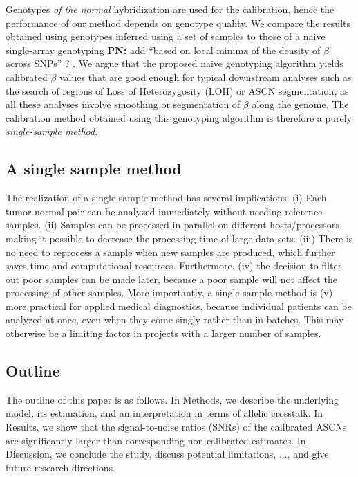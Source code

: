 \documentclass[10pt]{bmc_article}
\newenvironment{bmcformat}{\fussy\setboolean{publ}{true}}{\fussy}
\newenvironment{PN}{\color{blue}\textbf{PN:}}{}
\begin{document}
\begin{bmcformat}
Genotypes \emph{of the normal} hybridization are used for the calibration, hence the performance of our method depends on genotype quality. We compare the results obtained using genotypes inferred using a set of samples to those of a naive single-array genotyping
\begin{PN}
  add ``based on local minima of the density of $\beta$ across SNPs'' ?
\end{PN}. We argue that the proposed naive genotyping algorithm yields calibrated $\beta$ values that are good enough for typical downstream analyses such as the search of regions of Loss of Heterozygosity (LOH) or ASCN segmentation, as all these analyses  involve smoothing or segmentation of $\beta$ along the genome. The calibration method obtained using this genotyping algorithm is therefore a purely \emph{single-sample method}.


\subsection*{A single sample method}
The realization of a single-sample method has several implications:
(i) Each tumor-normal pair can be analyzed immediately without needing reference samples.
(ii) Samples can be processed in parallel on different hosts/processors making it possible to decrease the processing time of large data sets.
(iii) There is no need to reprocess a sample when new samples are produced, which further saves time and computational resources.
Furthermore, (iv) the decision to filter out poor samples can be made later, because a poor sample will not affect the processing of other samples.
More importantly, a single-sample method is
(v) more practical for applied medical diagnostics, because individual patients can be analyzed at once, even when they come singly rather than in batches.  This may otherwise be a limiting factor in projects with a larger number of samples.

\subsection*{Outline}
The outline of this paper is as follows. 
In Methods, we describe the underlying model, its estimation, and an interpretation in terms of allelic crosstalk. In Results, we show that the signal-to-noise ratios (SNRs) of the calibrated ASCNs are significantly larger than corresponding non-calibrated estimates.
In Discussion, we conclude the study, discuss potential limitations, ..., and give future research directions.



\end{bmcformat}
\end{document}
